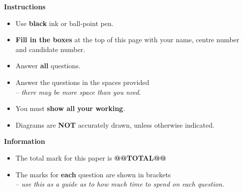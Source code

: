 \documentclass[a4paper,12pt]{article}
\begin{document}
{\begin{center}
\end{center}

{\small
\begin{adjustwidth}{1.5cm}{1.5cm}

  {\large\bfseries Instructions\par}
  \begin{itemize}[%
      left=1em,
      label=\textbullet,
      topsep=0pt, 
      partopsep=0pt,
      parsep=0pt, 
      itemsep=0pt
    ]
    \item Use \textbf{black} ink or ball‐point pen.
    \item \textbf{Fill in the boxes} at the top of this page with your name, centre number and candidate number.
    \item Answer \textbf{all} questions.
    \item Answer the questions in the spaces provided\\
          \hspace*{1em}-- \textit{there may be more space than you need}.
    \item You must \textbf{show all your working}.
    \item Diagrams are \textbf{NOT} accurately drawn, unless otherwise indicated.
  \end{itemize}

  \vspace{0.5em}
  {\large\bfseries Information\par}
  \begin{itemize}[%
      left=1em,
      label=\textbullet,
      topsep=0pt, 
      partopsep=0pt,
      parsep=0pt, 
      itemsep=0pt
    ]
    \item The total mark for this paper is \textbf{@@TOTAL@@}
    \item The marks for \textbf{each} question are shown in brackets\\
          \hspace*{1em}-- \textit{use this as a guide as to how much time to spend on each question}.
  \end{itemize}


\end{adjustwidth}}}
\end{document}
